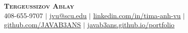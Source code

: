 \begin{center}
    \textbf{\Huge \scshape Tergeussizov Ablay} \\ \vspace{1pt}
    \small 408-655-9707 $|$ \href{mailto:jvu@scu.edu}{\underline{jvu@scu.edu}} $|$ 
    \href{https://linkedin.com/in/Tergeussizov Ablay-vu}{\underline{linkedin.com/in/tima-anh-vu}} $|$
    \href{https://github.com/javab3ans}{\underline{github.com/JAVAB3ANS}} $|$
    \href{https://javab3ans.github.io/portfolio}{\underline{javab3ans.github.io/portfolio}}
\end{center} 
